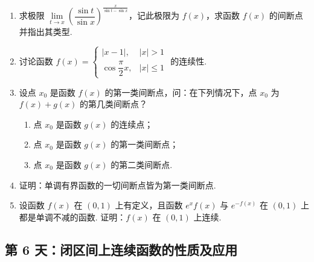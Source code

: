 \begin{enumerate}[label=\textbf{\arabic*.}, itemsep=4.5cm, resume]
    \item 求极限 $\lim\limits_{t \to x} \left( \dfrac{\sin t}{\sin x} \right)^{\frac{x}{\sin t - \sin x}}$，记此极限为 $f(x)$，求函数 $f(x)$ 的间断点并指出其类型.

    \item 讨论函数 $f(x) = \begin{cases} |x-1|, & |x| > 1 \\ \cos \dfrac{\pi}{2}x, & |x| \le 1 \end{cases}$ 的连续性.

    \item 设点 $x_0$ 是函数 $f(x)$ 的第一类间断点，问：在下列情况下，点 $x_0$ 为 $f(x) + g(x)$ 的第几类间断点？
    \begin{enumerate}[label=(\arabic*), itemsep=6cm]
        \item 点 $x_0$ 是函数 $g(x)$ 的连续点；
        \item 点 $x_0$ 是函数 $g(x)$ 的第一类间断点；
        \item 点 $x_0$ 是函数 $g(x)$ 的第二类间断点.
    \end{enumerate}

    \item 证明：单调有界函数的一切间断点皆为第一类间断点.

    \item 设函数 $f(x)$ 在 $(0, 1)$ 上有定义，且函数 $e^x f(x)$ 与 $e^{-f(x)}$ 在 $(0, 1)$ 上都是单调不减的函数. 证明：$f(x)$ 在 $(0, 1)$ 上连续.
\end{enumerate}

\newpage
\subsection*{第 6 天：闭区间上连续函数的性质及应用}
\vspace{1cm}

